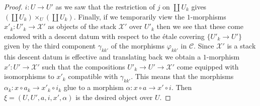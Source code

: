 \documentclass[10pt,a4paper]{amsart}
\theoremstyle{plain}
\theoremstyle{definition}
\theoremstyle{remark}
\numberwithin{equation}{subsection}
\begin{document}
\begin{proof}
$i : U \to U'$ as we saw that the restriction of $j$ on
$\coprod U_k$ gives $(\coprod U_k) \times_U (\coprod U_k)$.
Finally, if we temporarily view the $1$-morphisms
$x'_k : U'_k \to \mathcal{X}'$ as objects of the stack
$\mathcal{X}'$ over $U'_k$ then we see that these come endowed with a
descent datum with respect to the \'etale covering
$\{U'_k \to U'\}$ given by the third component $\gamma_{kk'}$
of the morphisms $\varphi_{kk'}$ in $\mathcal{C}$.
Since $\mathcal{X}'$ is a stack
this descent datum is effective and translating back we obtain
a $1$-morphism $x' : U' \to \mathcal{X}'$ such that the compositions
$U'_k \to U' \to \mathcal{X}'$ come equipped with isomorphisms to $x'_k$
compatible with $\gamma_{kk'}$. This means that the morphisms
$\alpha_k : x \circ a_k \to x'_k \circ i_k$ glue to a morphism
$\alpha : x \circ a \to x' \circ i$. Then $\xi = (U, U', a, i, x', \alpha)$
is the desired object over $U$.
\end{proof}
\end{document}

